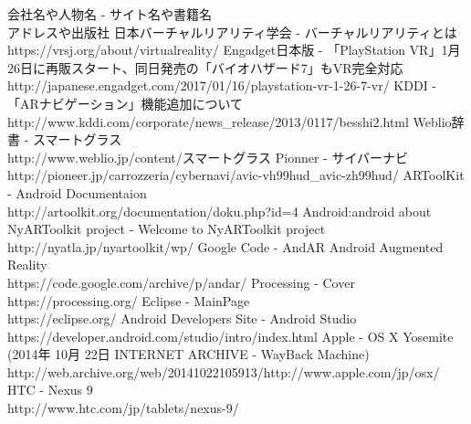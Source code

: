 \begin{thebibliography}{99}
	 会社名や人物名 - サイト名や書籍名\\ アドレスや出版社
	 日本バーチャルリアリティ学会 - バーチャルリアリティとは\\ https://vrsj.org/about/virtualreality/
	 Engadget日本版 - 「PlayStation VR」1月26日に再販スタート、同日発売の「バイオハザード7」もVR完全対応\\ http://japanese.engadget.com/2017/01/16/playstation-vr-1-26-7-vr/
	 KDDI - 「ARナビゲーション」機能追加について\\ http://www.kddi.com/corporate/news\_release/2013/0117/besshi2.html
	 Weblio辞書 - スマートグラス\\ http://www.weblio.jp/content/スマートグラス
	 Pionner - サイバーナビ\\ http://pioneer.jp/carrozzeria/cybernavi/avic-vh99hud\_avic-zh99hud/
	 ARToolKit - Android Documentaion\\ http://artoolkit.org/documentation/doku.php?id=4 Android:android about
	 NyARToolkit project - Welcome to NyARToolkit project\\ http://nyatla.jp/nyartoolkit/wp/
	 Google Code - AndAR Android Augmented Reality\\ https://code.google.com/archive/p/andar/
	 Processing - Cover\\ https://processing.org/
	 Eclipse - MainPage\\ https://eclipse.org/
	 Android Developers Site - Android Studio\\ https://developer.android.com/studio/intro/index.html
	 Apple - OS X Yosemite (2014年 10月 22日 INTERNET ARCHIVE - WayBack Machine)\\ http://web.archive.org/web/20141022105913/http://www.apple.com/jp/osx/
	 HTC - Nexus 9\\ http://www.htc.com/jp/tablets/nexus-9/
\end{thebibliography}